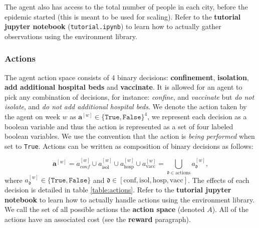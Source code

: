 \documentclass[10pt]{article}
\begin{document}
The agent also has access to the total number of people in each city, before the epidemic started (this is meant to be used for scaling). Refer to the \textbf{tutorial jupyter notebook} (\texttt{tutorial.ipynb}) to learn how to actually gather observations using the environment library.

\subsubsection*{Actions}
The agent action space consists of $4$ binary decisions: \textbf{confinement}, \textbf{isolation}, \textbf{add additional hospital beds} and \textbf{vaccinate}. It is allowed for an agent to pick any combination of decisions, for instance: \textit{confine}, and \textit{vaccinate} but \textit{do not isolate}, and \textit{do not add additional hospital beds}. 
We denote the action taken by the agent on week $w$ as $\mathbf{a}^{[w]} \in \{\texttt{True},\texttt{False}\}^{4}$, we represent each decision as a boolean variable and thus the action is represented as a set of four labeled boolean variables. We use the convention that the action is \textit{being performed} when set to \texttt{True}. Actions can be written as composition of binary decisions as follows:

\begin{equation}
  \mathbf{a}^{[w]} = a_\textit{conf}^{[w]} \cup a_\text{isol}^{[w]} \cup a_\text{hosp}^{[w]} \cup a_\text{vacc}^{[w]} = \bigcup_{\mathfrak{d} \in \text{actions}}a_\mathfrak{d}^{[w]},
\end{equation}
where $a_\mathfrak{d}^{[w]} \in \{\texttt{True},\texttt{False}\}$ and $\mathfrak{d} \in [\text{conf},\text{isol},\text{hosp},\text{vacc}]$.
The effects of each decision is detailed in table \ref{table:actions}. Refer to the \textbf{tutorial jupyter notebook} to learn how to actually handle actions using the environment library. We call the set of all possible actions the \textbf{action space} (denoted $A$). All of the actions have an associated cost (see the \textbf{reward} paragraph).
\end{document}
